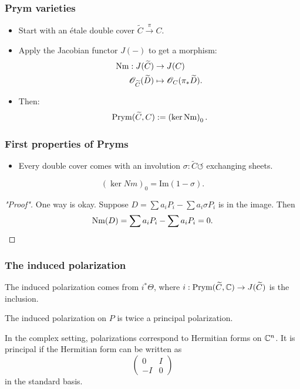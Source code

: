 \begin{frame}
\frametitle{Prym varieties}


\begin{itemize}
	\item Start with an étale double cover \alert{$\widetilde C \xrightarrow{\pi} C$}.
	\pause
	\item Apply the Jacobian functor $J(-)$ to get a morphism:
	\begin{align*}
	\operatorname{Nm}:J(\widetilde C) &\to J(C) \\
	\mathscr{O}_{\widetilde C}(\widetilde D) &\mapsto \mathscr{O}_C(\pi_\ast \widetilde D).
	\end{align*}
	\pause

	\item Then:
	\alert{
	\[
	\operatorname{Prym}(\widetilde C, C) := \left(\ker \operatorname{Nm} \right)_0.
	\]
	}
\end{itemize}

\end{frame}


\begin{frame}
\frametitle{First properties of Pryms}

\begin{itemize}
	\item Every double cover comes with an involution $\sigma:  \widetilde C \circlearrowleft$ exchanging sheets.
\end{itemize}


\begin{proposition}
\[
(\ker Nm)_0 = \mathrm{Im}(1-\sigma).
\]
\end{proposition}
\begin{proof}["Proof"]
One way is okay. Suppose $D= \sum a_i P_i - \sum a_i \sigma{P_i}$ is in the image. Then
\[
\operatorname{Nm}(D) = \sum a_i P_i - \sum a_i P_i = 0.
\]
\end{proof}
\end{frame}

\begin{frame}
\frametitle{The induced polarization}

The induced polarization comes from \alert{$i^\ast \Theta$}, where $i:\operatorname{Prym}(\widetilde C, \mathbb{C}) \to J(\widetilde C)$ is the inclusion.

\begin{theorem}
The induced polarization on $P$ is twice a principal polarization.
\end{theorem}
\pause
\begin{remark}
In the complex setting, polarizations correspond to Hermitian forms on $\mathbb{C}^n$. It is principal if the Hermitian form can be written as 
\[
\begin{pmatrix}
0 & I \\
-I &0
\end{pmatrix}
\]
in the standard basis.
\end{remark}
\end{frame}

